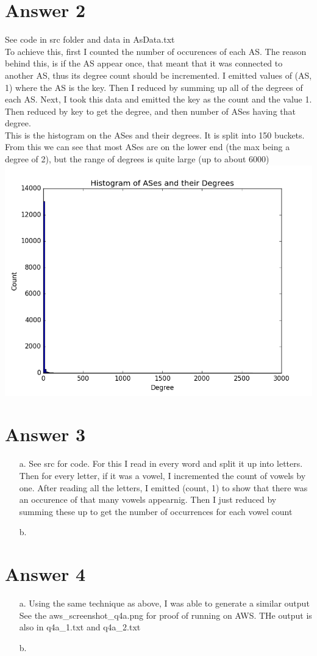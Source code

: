 \documentclass[11pt]{article}
\theoremstyle{definition}
\begin{document}
\section*{Answer 2}
See code in src folder and data in AsData.txt\\
To achieve this, first I counted the number of occurences of each AS.  The reason behind this, is if the AS appear once, that meant that it was connected to another AS, thus its degree count should be incremented.  I emitted values of (AS, 1) where the AS is the key.  Then I reduced by summing up all of the degrees of each AS.  Next, I took this data and emitted the key as the count and the value 1.  Then reduced by key to get the degree, and then number of ASes having that degree.\\
This is the histogram on the ASes and their degrees.  It is split into 150 buckets.  From this we can see that most ASes are on the lower end (the max being a degree of 2), but the range of degrees is quite large (up to about 6000)\\
\includegraphics[scale=0.5]{hist}

\section*{Answer 3}
\begin{enumerate}
  \item[a.] See src for code.  For this I read in every word and split it up into letters.  Then for every letter, if it was a vowel, I incremented the count of vowels by one.  After reading all the letters, I emitted (count, 1) to show that there was an occurence of that many vowels appearnig.  Then I just reduced by summing these up to get the number of occurrences for each vowel count\\

  \item[b.]
\end{enumerate}

\section*{Answer 4}
\begin{enumerate}
  \item[a.] Using the same technique as above, I was able to generate a similar output\\
  See the aws\_screenshot\_q4a.png for proof of running on AWS.  THe output is also in q4a\_1.txt and q4a\_2.txt

  \item[b.]
\end{enumerate}
\end{document}
